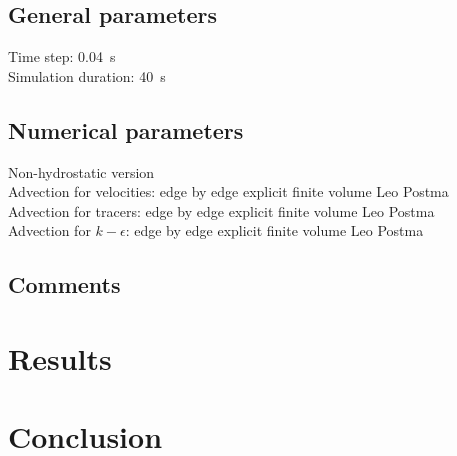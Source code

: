 \subsection{General parameters}
%
Time step: 0.04~s\\
Simulation duration: 40~s
%
%
%
\subsection{Numerical parameters}
%
Non-hydrostatic version\\
Advection for velocities: edge by edge explicit finite volume Leo
Postma\\
Advection for tracers: edge by edge explicit finite volume Leo
Postma\\
Advection for $k-\epsilon$: edge by edge explicit finite volume Leo
Postma
%
\subsection{Comments}
%
%
%
\section{Results}
%

%
\section{Conclusion}
%

%
%
